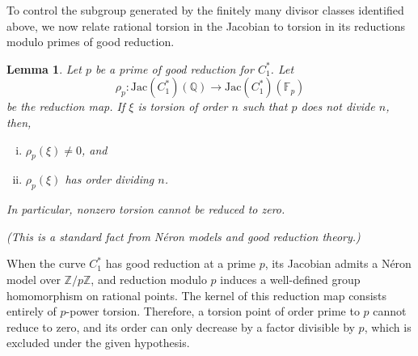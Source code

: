 \documentclass[12pt, reqno]{amsart}
\newtheorem{lemma}[thm]{Lemma}
\numberwithin{equation}{section}
\theoremstyle{definition}
\theoremstyle{nodefstyle}
\begin{document}
To control the subgroup generated by the finitely many divisor classes identified above, we now relate rational torsion in the Jacobian to torsion in its reductions modulo primes of good reduction.

\begin{lemma}\label{lem:4}
Let \(p\) be a prime of good reduction for \(C_1^*\).  
Let
\[
\rho_p : \mathrm{Jac}(C_1^*)(\mathbb Q) \to \mathrm{Jac}(C_1^*)(\mathbb F_p)
\]
be the reduction map.  
If \(\xi\) is torsion of order \(n\) such that $p$ does not divide $n$, then,
\begin{enumerate}[i.]
    \item \(\rho_p(\xi)\neq 0\), and  
    \item \(\rho_p(\xi)\) has order dividing \(n\).
\end{enumerate}

In particular, nonzero torsion cannot be reduced to zero.

(This is a standard fact from Néron models and good reduction theory.)
\end{lemma}

When the curve $C_1^*$ has good reduction at a prime $p$, its Jacobian admits a Néron model over $\mathbb{Z}/{p\mathbb{Z}}$, and reduction modulo $p$ induces a well-defined group homomorphism on rational points. 
The kernel of this reduction map consists entirely of $p$-power torsion. 
Therefore, a torsion point of order prime to $p$ cannot reduce to zero, and its order can only decrease by a factor divisible by $p$, which is excluded under the given hypothesis.
\end{document}
